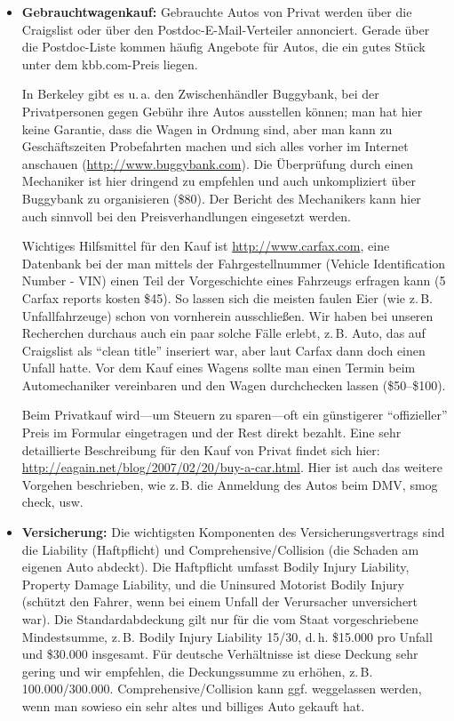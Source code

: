 \documentclass[a4paper]{scrreprt}
\begin{document}
\begin{itemize}

\item \textbf{Gebrauchtwagenkauf:} Gebrauchte Autos von Privat werden über die Craigslist oder über den Postdoc-E-Mail-Verteiler annonciert. 
Gerade über die Postdoc-Liste kommen häufig Angebote für Autos, die ein gutes Stück unter dem kbb.com-Preis liegen.

In Berkeley gibt es u.\,a. den Zwischenhändler Buggybank, bei der Privatpersonen gegen Gebühr ihre Autos ausstellen können; man hat hier keine Garantie, dass die Wagen in Ordnung sind, aber man kann zu Geschäftszeiten Probefahrten machen und sich alles vorher im Internet anschauen (\url{http://www.buggybank.com}). Die Überprüfung durch einen Mechaniker ist hier dringend zu empfehlen und auch unkompliziert über Buggybank zu organisieren (\$80). Der Bericht des Mechanikers kann hier auch sinnvoll bei den Preisverhandlungen eingesetzt werden.
	
Wichtiges Hilfsmittel für den Kauf ist \url{http://www.carfax.com}, eine Datenbank bei der man mittels der Fahrgestellnummer (Vehicle Identification Number - VIN) einen Teil der Vorgeschichte eines Fahrzeugs erfragen kann (5 Carfax reports kosten \$45). So lassen sich die meisten faulen Eier (wie z.\,B. Unfallfahrzeuge) schon von vornherein ausschließen. Wir haben bei unseren Recherchen durchaus auch ein paar solche Fälle erlebt, z.\,B. Auto, das auf Craigslist als ``clean title'' inseriert war, aber laut Carfax dann doch einen Unfall hatte. Vor dem Kauf eines Wagens sollte man einen Termin beim Automechaniker vereinbaren und den Wagen durchchecken lassen (\$50--\$100).

Beim Privatkauf wird---um Steuern zu sparen---oft ein günstigerer ``offizieller'' Preis im Formular eingetragen und der Rest direkt bezahlt. Eine sehr detaillierte Beschreibung für den Kauf von Privat findet sich hier: \url{http://eagain.net/blog/2007/02/20/buy-a-car.html}. Hier ist auch das weitere Vorgehen beschrieben, wie z.\,B. die Anmeldung des Autos beim DMV, smog check, usw.
	
\item \textbf{Versicherung:} Die wichtigsten Komponenten des Versicherungsvertrags sind die Liability (Haftpflicht) und Comprehensive/Collision (die Schaden am eigenen Auto abdeckt). Die Haftpflicht umfasst Bodily Injury Liability, Property Damage Liability, und die Uninsured Motorist Bodily Injury (schützt den Fahrer, wenn bei einem Unfall der Verursacher unversichert war). Die Standardabdeckung gilt nur für die vom Staat vorgeschriebene Mindestsumme, z.\,B. Bodily Injury Liability 15/30, d.\,h. \$15.000 pro Unfall und \$30.000 insgesamt. Für deutsche Verhältnisse ist diese Deckung sehr gering und wir empfehlen, die Deckungssumme zu erhöhen, z.\,B. 100.000/300.000. Comprehensive/Collision kann ggf. weggelassen werden, wenn man sowieso ein sehr altes und billiges Auto gekauft hat.


\end{itemize}
\end{document}
